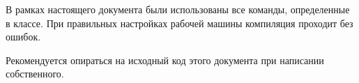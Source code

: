 
В рамках настоящего документа были использованы все команды, определенные в
классе. При правильных настройках рабочей машины компиляция проходит без ошибок.

Рекомендуется опираться на исходный код этого документа при написании
собственного.